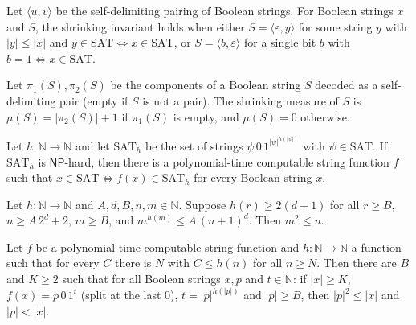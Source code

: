 \begin{definition}
\label{Complexity.ladner_ShrinkInv}
\leanok
{}
Let $\langle u,v\rangle$ be the self-delimiting pairing of Boolean strings. For Boolean
strings $x$ and $S$, the shrinking invariant holds when either $S=\langle\varepsilon,y\rangle$
for some string $y$ with $|y|\le|x|$ and $y\in\mathrm{SAT}\iff x\in\mathrm{SAT}$, or
$S=\langle b,\varepsilon\rangle$ for a single bit $b$ with $b=1\iff x\in\mathrm{SAT}$.
\end{definition}

\begin{definition}
\label{Complexity.ladner_shrinkMeasure}
\leanok
{}
Let $\pi_1(S),\pi_2(S)$ be the components of a Boolean string $S$ decoded as a
self-delimiting pair (empty if $S$ is not a pair). The shrinking measure of $S$ is
$\mu(S)=|\pi_2(S)|+1$ if $\pi_1(S)$ is empty, and $\mu(S)=0$ otherwise.
\end{definition}

\begin{theorem}
\label{Complexity.ladner_reduction_from_hardness}
\leanok
{}
Let $h:\mathbb N\to\mathbb N$ and let $\mathrm{SAT}_h$ be the set of strings
$\psi\,0\,1^{|\psi|^{h(|\psi|)}}$ with $\psi\in\mathrm{SAT}$. If $\mathrm{SAT}_h$ is
$\mathsf{NP}$-hard, then there is a polynomial-time computable string function $f$ such that
$x\in\mathrm{SAT}\iff f(x)\in\mathrm{SAT}_h$ for every Boolean string $x$.
\end{theorem}

\begin{theorem}
\label{Complexity.ladner_prefix_square_bound}
\leanok
{}
Let $h:\mathbb N\to\mathbb N$ and $A,d,B,n,m\in\mathbb N$. Suppose $h(r)\ge 2(d+1)$ for all
$r\ge B$, $n\ge A\,2^d+2$, $m\ge B$, and $m^{h(m)}\le A\,(n+1)^d$. Then $m^2\le n$.
\end{theorem}

\begin{theorem}
\label{Complexity.ladner_reduction_shrinks}
\leanok
{}
Let $f$ be a polynomial-time computable string function and $h:\mathbb N\to\mathbb N$ a
function such that for every $C$ there is $N$ with $C\le h(n)$ for all $n\ge N$. Then there
are $B$ and $K\ge 2$ such that for all Boolean strings $x,p$ and $t\in\mathbb N$: if
$|x|\ge K$, $f(x)=p\,0\,1^t$ (split at the last $0$), $t=|p|^{h(|p|)}$ and $|p|\ge B$, then
$|p|^2\le|x|$ and $|p|<|x|$.
\end{theorem}

